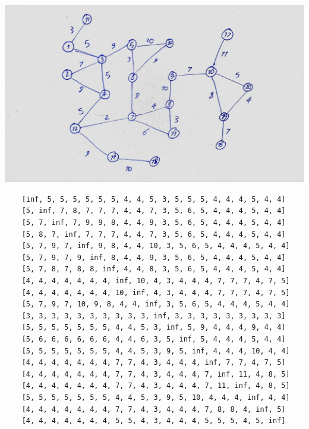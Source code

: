 \documentclass[]{article}
\begin{document}
\includegraphics*[scale=0.35]{switch_graph.jpeg}
\begin{latin}
\begin{lstlisting}
    [inf, 5, 5, 5, 5, 5, 5, 4, 4, 5, 3, 5, 5, 5, 4, 4, 4, 5, 4, 4]
    [5, inf, 7, 8, 7, 7, 7, 4, 4, 7, 3, 5, 6, 5, 4, 4, 4, 5, 4, 4]
    [5, 7, inf, 7, 9, 9, 8, 4, 4, 9, 3, 5, 6, 5, 4, 4, 4, 5, 4, 4]
    [5, 8, 7, inf, 7, 7, 7, 4, 4, 7, 3, 5, 6, 5, 4, 4, 4, 5, 4, 4]
    [5, 7, 9, 7, inf, 9, 8, 4, 4, 10, 3, 5, 6, 5, 4, 4, 4, 5, 4, 4]
    [5, 7, 9, 7, 9, inf, 8, 4, 4, 9, 3, 5, 6, 5, 4, 4, 4, 5, 4, 4]
    [5, 7, 8, 7, 8, 8, inf, 4, 4, 8, 3, 5, 6, 5, 4, 4, 4, 5, 4, 4]
    [4, 4, 4, 4, 4, 4, 4, inf, 10, 4, 3, 4, 4, 4, 7, 7, 7, 4, 7, 5]
    [4, 4, 4, 4, 4, 4, 4, 10, inf, 4, 3, 4, 4, 4, 7, 7, 7, 4, 7, 5]
    [5, 7, 9, 7, 10, 9, 8, 4, 4, inf, 3, 5, 6, 5, 4, 4, 4, 5, 4, 4]
    [3, 3, 3, 3, 3, 3, 3, 3, 3, 3, inf, 3, 3, 3, 3, 3, 3, 3, 3, 3]
    [5, 5, 5, 5, 5, 5, 5, 4, 4, 5, 3, inf, 5, 9, 4, 4, 4, 9, 4, 4]
    [5, 6, 6, 6, 6, 6, 6, 4, 4, 6, 3, 5, inf, 5, 4, 4, 4, 5, 4, 4]
    [5, 5, 5, 5, 5, 5, 5, 4, 4, 5, 3, 9, 5, inf, 4, 4, 4, 10, 4, 4]
    [4, 4, 4, 4, 4, 4, 4, 7, 7, 4, 3, 4, 4, 4, inf, 7, 7, 4, 7, 5]
    [4, 4, 4, 4, 4, 4, 4, 7, 7, 4, 3, 4, 4, 4, 7, inf, 11, 4, 8, 5]
    [4, 4, 4, 4, 4, 4, 4, 7, 7, 4, 3, 4, 4, 4, 7, 11, inf, 4, 8, 5]
    [5, 5, 5, 5, 5, 5, 5, 4, 4, 5, 3, 9, 5, 10, 4, 4, 4, inf, 4, 4]
    [4, 4, 4, 4, 4, 4, 4, 7, 7, 4, 3, 4, 4, 4, 7, 8, 8, 4, inf, 5]
    [4, 4, 4, 4, 4, 4, 4, 5, 5, 4, 3, 4, 4, 4, 5, 5, 5, 4, 5, inf]    
\end{lstlisting}
\end{latin}
\end{document}
